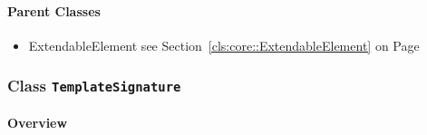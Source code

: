 	



\paragraph{Parent Classes}
\begin{itemize}
\item ExtendableElement see Section~\ref{cls:core::ExtendableElement} on Page~\pageref{cls:core::ExtendableElement}\end{itemize}
\subsubsection{\Large{Class \bfseries \texttt{TemplateSignature}\normalfont}}
\label{cls:storydiagrams::templates::TemplateSignature} 
\paragraph{Overview}

	
